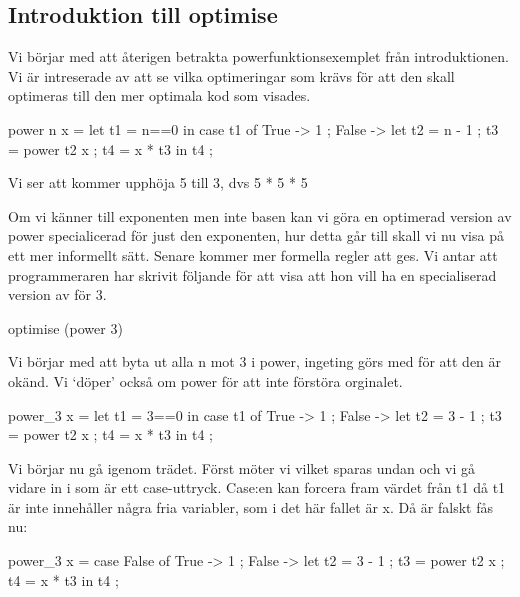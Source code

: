 \documentclass[../Optimise]{subfiles}
\begin{document}
\subsection{Introduktion till optimise}

Vi börjar med att återigen betrakta powerfunktionsexemplet från introduktionen. Vi är
intreserade av att se vilka optimeringar som krävs för att den skall optimeras till den
mer optimala kod som visades.
\begin{codeEx}
power n x = let t1 = n==0
    in case t1 of
        { True -> 1
        ; False -> let 
            { t2 = n - 1 
            ; t3 = power t2 x
            ; t4 = x * t3
            } in t4
        };
\end{codeEx}
Vi ser att  kommer upphöja 5 till 3, dvs 5 * 5 * 5

Om vi känner till exponenten men inte basen kan vi göra en optimerad version av power
specialicerad för just den exponenten, hur detta går till skall vi nu visa på ett 
mer informellt sätt. Senare kommer mer formella regler att ges. Vi antar att programmeraren
har skrivit följande för att visa att hon vill ha en specialiserad version av  för $3$.

\begin{codeEx}
optimise (power 3)
\end{codeEx}

Vi börjar med att byta ut alla n mot 3 i power, ingeting görs med  för 
att den är okänd. Vi `döper' också om power för att inte förstöra orginalet.
\begin{codeEx}
power_3 x = let t1 = 3==0
    in case t1 of
        { True -> 1
        ; False -> let 
            { t2 = 3 - 1 
            ; t3 = power t2 x
            ; t4 = x * t3
            } in t4
        };
\end{codeEx}

Vi börjar nu gå igenom trädet. Först möter vi  vilket sparas undan och vi gå vidare in i  som är ett case-uttryck. Case:en kan forcera fram värdet från t1 då t1 är inte innehåller några fria variabler, som i det här fallet är x. Då  är falskt fås nu: 

\begin{codeEx}
power_3 x = case False of
    { True -> 1
    ; False -> let 
        { t2 = 3 - 1 
        ; t3 = power t2 x
        ; t4 = x * t3
        } in t4
    };
\end{codeEx}
\end{document}
